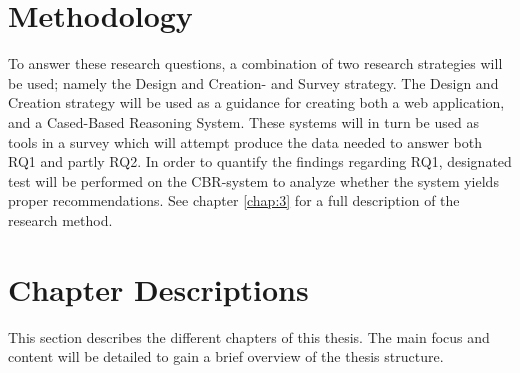 \section{Methodology}
To answer these research questions, a combination of two research strategies will be used; namely the Design and Creation- and Survey strategy. The Design and Creation strategy will be used as a guidance for creating both a web application, and a Cased-Based Reasoning System. These systems will in turn be used as tools in a survey which will attempt produce the data needed to answer both RQ1 and partly RQ2. In order to quantify the findings regarding RQ1, designated test will be performed on the CBR-system to analyze whether the system yields proper recommendations. See chapter \ref{chap:3} for a full description of the research method.

\iffalse
\section{Contributions}

This research's contribution will yield a new computer based artefact; specifically an IS with the goal of both motivating and making it easier for students at NTNU to apply for a study exchange program.

As implied by some of the similar systems and solutions already mentioned, this research will invent a new innovating system that could be extended to other universities. Aside from simplifying this process, the research will contribute by giving new insight and knowledge about what an IS can do to increase the motivation for students to apply for a study exchange program, and if it is possible to completely automate part of this process, as well as providing automated intelligent educated guesses for the most suitable and relevant courses a student should choose. Considering this research objective is primarily designed as a contribution to NTNU, who currently does most of this process manually, if this research and product proves to be successful, it will be a great contribution for NTNU. All though there exists similar systems in other universities which focus on some of the same objectives as this research, commercial-off-the-shelf (COTS) products can not be implemented, when the dependencies and infrastructure is so different for different universities.
\fi

\section{Chapter Descriptions}
This section describes the different chapters of this thesis. The main focus and content will be detailed to gain a brief overview of the thesis structure. 

